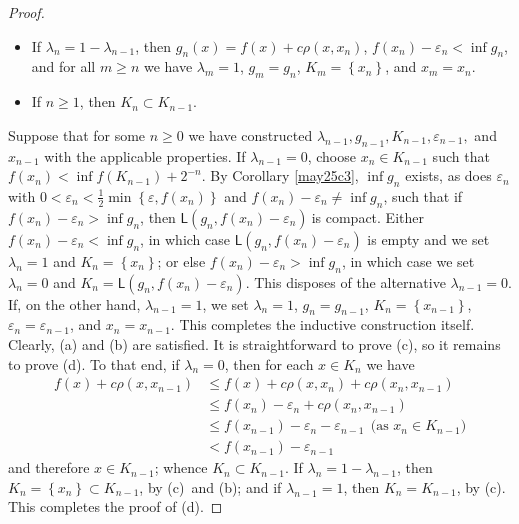 \documentclass[10pt,a4paper]{amsart}
\begin{document}
\begin{proof}
\begin{itemize}
\item[(c)] If $\lambda_{n}=1-\lambda_{n-1}$, then $g_{n}(x)=f(x)+c\rho
(x,x_{n})$, $f(x_{n})-\varepsilon_{n}<\inf g_{n}$, and for all $m\geqslant n $
we have $\lambda_{m}=1$, $g_{m}=g_{n}$, $K_{m}=\left\{  x_{n}\right\}  $, and
$x_{m}=x_{n}$.

\item[(d)] If $n\geqslant1$, then $K_{n}\subset K_{n-1}$.
\end{itemize}

%

\noindent
Suppose that for some $n\geqslant0$ we have constructed $\lambda_{n-1}%
,g_{n-1},K_{n-1},\varepsilon_{n-1},$ and $x_{n-1}$ with the applicable
properties. If $\lambda_{n-1}=0$, choose $x_{n}\in K_{n-1}$ such that
$f(x_{n})<\inf f(K_{n-1})+2^{-n}$. By Corollary \ref{may25c3}, $\inf g_{n}$
exists, as does $\varepsilon_{n}$ with $0<\varepsilon_{n}<\frac{1}{2}%
\min\left\{  \varepsilon,f(x_{n})\right\}  $ and $f(x_{n})-\varepsilon_{n}%
\neq\inf g_{n}$, such that if $f(x_{n})-\varepsilon_{n}>\inf g_{n}$, then
$\mathsf{L}(g_{n},f(x_{n})-\varepsilon_{n})\ $is compact. Either
$f(x_{n})-\varepsilon_{n}<\inf g_{n}$, in which case $\mathsf{L}(g_{n}%
,f(x_{n})-\varepsilon_{n})$ is empty and we set $\lambda_{n}=1$ and
$K_{n}=\left\{  x_{n}\right\}  $; or else $f(x_{n})-\varepsilon_{n}>\inf
g_{n}$, in which case we set $\lambda_{n}=0$ and $K_{n}=\mathsf{L}%
(g_{n},f(x_{n})-\varepsilon_{n})$. This disposes of the alternative
$\lambda_{n-1}=0$. If, on the other hand, $\lambda_{n-1}=1$, we set
$\lambda_{n}=1$, $g_{n}=g_{n-1}$, $K_{n}=\left\{  x_{n-1}\right\}  $,
$\varepsilon_{n}=\varepsilon_{n-1}$, and $x_{n}=x_{n-1}$. This completes the
inductive construction itself. Clearly, (a) and (b) are satisfied. It is
straightforward to prove (c), so it remains to prove (d). To that end, if
$\lambda_{n}=0$, then for each $x\in K_{n}$ we have
\begin{align*}
f\left(  x\right)  +c\rho\left(  x,x_{n-1}\right)   &  \leqslant f\left(
x\right)  +c\rho\left(  x,x_{n}\right)  +c\rho\left(  x_{n},x_{n-1}\right) \\
&  \leqslant f\left(  x_{n}\right)  -\varepsilon_{n}+c\rho\left(
x_{n},x_{n-1}\right) \\
&  \leqslant f\left(  x_{n-1}\right)  -\varepsilon_{n}-\varepsilon
_{n-1}\ \ \text{(as }x_{n}\in K_{n-1}\text{)}\\
&  <f\left(  x_{n-1}\right)  -\varepsilon_{n-1}%
\end{align*}
and therefore $x\in K_{n-1}$; whence $K_{n}\subset K_{n-1}$. If $\lambda
_{n}=1-\lambda_{n-1}$, then $K_{n}=\left\{  x_{n}\right\}  \subset K_{n-1}$,
by (c)~and (b); and if $\lambda_{n-1}=1$, then $K_{n}=K_{n-1}$, by (c). This
completes the proof of (d).


\end{proof}
\end{document}
